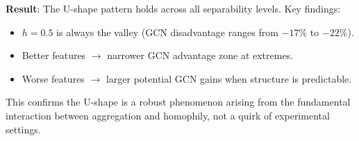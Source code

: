 \textbf{Result}: The U-shape pattern holds across all separability levels. Key findings:
\begin{itemize}
    \item $h = 0.5$ is always the valley (GCN disadvantage ranges from $-17\%$ to $-22\%$).
    \item Better features $\rightarrow$ narrower GCN advantage zone at extremes.
    \item Worse features $\rightarrow$ larger potential GCN gains when structure is predictable.
\end{itemize}

This confirms the U-shape is a robust phenomenon arising from the fundamental interaction between aggregation and homophily, not a quirk of experimental settings.
